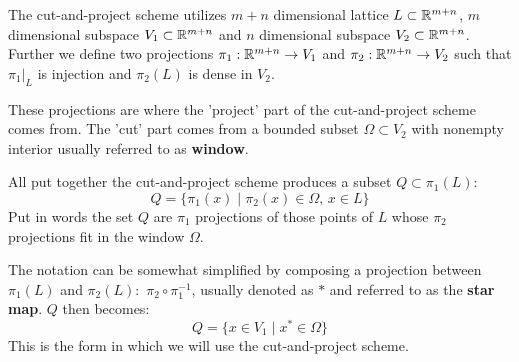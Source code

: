 \documentclass[text.tex]{subfiles}
\begin{document}
The cut-and-project scheme utilizes $m+n$ dimensional lattice $L\subset\mathbb{R}^{m+n}$, $m$ dimensional subspace $V_1\subset\mathbb{R}^{m+n}$ and $n$ dimensional subspace $V_2\subset\mathbb{R}^{m+n}$. Further we define two projections $\pi_1:\mathbb{R}^{m+n}\rightarrow V_1$ and $\pi_2:\mathbb{R}^{m+n}\rightarrow V_2$ such that $\pi_1|_L$ is injection and $\pi_2(L)$ is dense in $V_2$. 

These projections are where the 'project' part of the cut-and-project scheme comes from. The 'cut' part comes from a bounded subset $\Omega\subset V_2$ with nonempty interior usually referred to as \textbf{window}. 

All put together the cut-and-project scheme produces a subset $Q\subset \pi_1(L)$:
$$Q = \{ \pi_1(x)\; |\; \pi_2(x)\in \Omega,\,  x\in L \}$$
Put in words the set $Q$ are $\pi_1$ projections of those points of $L$ whose $\pi_2$ projections fit in the window $\Omega$. 

The notation can be somewhat simplified by composing a projection between $\pi_1(L)$ and $\pi_2(L)$:~$\pi_2\circ\pi^{-1}_1$, usually denoted as $\ast$ and referred to as the \textbf{star map}. $Q$ then becomes:
$$Q = \{ x \in V_1\; |\; x^\ast\in \Omega \}$$
This is the form in which we will use the cut-and-project scheme. 
\end{document}
